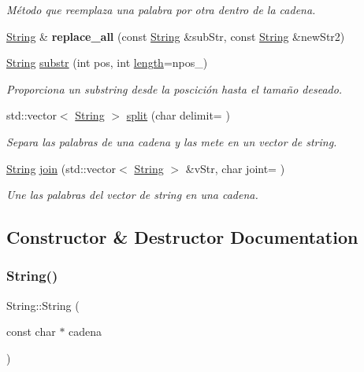 \begin{DoxyCompactItemize}
\begin{DoxyCompactList}\small\item\em Método que reemplaza una palabra por otra dentro de la cadena. \end{DoxyCompactList}\item 
\mbox{\label{class_string_a3b38a22824771b11054f44517aef07eb}} 
\hyperlink{class_string}{String} \& {\bfseries replace\+\_\+all} (const \hyperlink{class_string}{String} \&sub\+Str, const \hyperlink{class_string}{String} \&new\+Str2)
\item 
\hyperlink{class_string}{String} \hyperlink{class_string_a2f700a145e4069416cc031e9b02d73b7}{substr} (int pos, int \hyperlink{class_string_a79366b9ecdbde9701a9acfe0009a5ded}{length}=npos\+\_\+)
\begin{DoxyCompactList}\small\item\em Proporciona un substring desde la poscición hasta el tamaño deseado. \end{DoxyCompactList}\item 
std\+::vector$<$ \hyperlink{class_string}{String} $>$ \hyperlink{class_string_a2727c185f04dc7f6be19c48f065b884c}{split} (char delimit=\textquotesingle{} \textquotesingle{})
\begin{DoxyCompactList}\small\item\em Separa las palabras de una cadena y las mete en un vector de string. \end{DoxyCompactList}\item 
\hyperlink{class_string}{String} \hyperlink{class_string_ad819c6db041854f0b6908b530ffd4331}{join} (std\+::vector$<$ \hyperlink{class_string}{String} $>$ \&v\+Str, char joint=\textquotesingle{} \textquotesingle{})
\begin{DoxyCompactList}\small\item\em Une las palabras del vector de string en una cadena. \end{DoxyCompactList}\end{DoxyCompactItemize}


\subsection{Constructor \& Destructor Documentation}
\mbox{\label{class_string_a4c35f4fb85fec55f015c3605e9160d60}} 
\subsubsection{\texorpdfstring{String()}{String()}\hspace{0.1cm}{\footnotesize\ttfamily [1/4]}}
{\footnotesize\ttfamily String\+::\+String (\begin{DoxyParamCaption}\item[{const char $\ast$}]{cadena }\end{DoxyParamCaption})}



